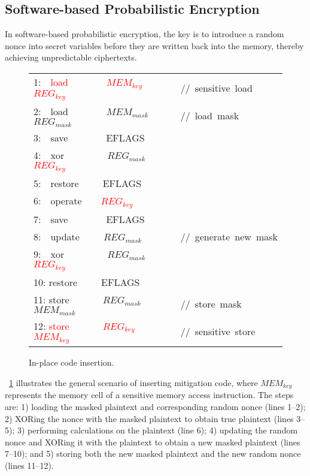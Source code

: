 \subsection{Software-based Probabilistic Encryption}
\label{subsec:datamasking}

In software-based probabilistic encryption, the key is to introduce a random nonce into secret variables before they are written back into the memory, thereby achieving unpredictable ciphertexts. 

\begin{figure}[htbp]
    \centering
    \footnotesize
    \begin{tabular}{|ll|}
        \hline
        1:\ \ \textcolor{red}{load\ \ \ \ \ \ \ \ $MEM_{key}$\ \ \ \ $REG_{key}$} &//\ sensitive\ load\\
        2:\ \ load\ \ \ \ \ \ \ \ $MEM_{mask}$\ \ $REG_{mask}$ &//\ load\ mask\\
        3:\ \ save\ \ \ \ \ \ \ \ EFLAGS &\\
        4:\ \ xor\ \ \ \ \ \ \ \ \ $REG_{mask}$\ \ \ \ \textcolor{red}{$REG_{key}$} &\\
        5:\ \ restore\ \ \ \ \ EFLAGS &\\
        6:\ \ operate\ \ \ \ \textcolor{red}{$REG_{key}$} &\\
        7:\ \ save\ \ \ \ \ \ \ \ EFLAGS &\\
        8:\ \ update\ \ \ \ \ $REG_{mask}$ &//\ generate\ new\ mask\\
        9:\ \ xor\ \ \ \ \ \ \ \ \ $REG_{mask}$\ \ \ \ \textcolor{red}{$REG_{key}$} &\\
        10: restore\ \ \ \ \ EFLAGS &\\
        11: store\ \ \ \ \ \ \ $REG_{mask}$\ \ \ \ $MEM_{mask}$ &//\ store\ mask\\
        12: \textcolor{red}{store\ \ \ \ \ \ \ $REG_{key}$\ \ \ \ \ \ $MEM_{key}$} &//\ sensitive\ store \\
        \hline
    \end{tabular}
    \caption{In-place code insertion.}
    \label{fig:maskcode}
\end{figure}

\F~\ref{fig:maskcode} illustrates the general scenario of inserting mitigation code, where $MEM_{key}$ represents the memory cell of a sensitive memory access instruction.
The steps are: 1) loading the masked plaintext and corresponding random nonce (lines 1--2); 2) XORing the nonce with the masked plaintext to obtain true plaintext (lines 3--5); 3) performing calculations on the plaintext (line 6); 4) updating the random nonce and XORing it with the plaintext to obtain a new masked plaintext (lines 7--10); and 5) storing both the new masked plaintext and the new random nonce (lines 11--12).


